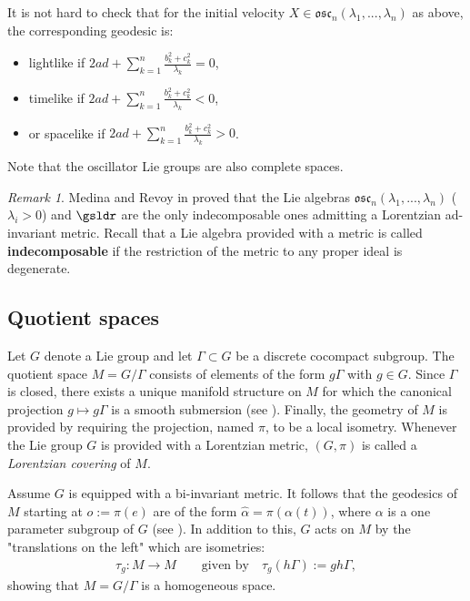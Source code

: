 \documentclass[12pt]{amsart}
\theoremstyle{plain}
\theoremstyle{definition}
\theoremstyle{remark}
\newtheorem{rem}{Remark}
\begin{document}
	It is not hard to check that for the initial velocity $X \in \mathfrak{osc}_n(\lambda_1,...,\lambda_n)$ as above, the corresponding geodesic is:
	\begin{itemize}
		\item lightlike if $2 a d + \sum_{k=1}^{n} \frac{b_k^2+c_k^2}{\lambda_k} = 0$,
		\item timelike if $2 a d + \sum_{k=1}^{n} \frac{b_k^2+c_k^2}{\lambda_k} < 0$, 
		\item or spacelike if $2 a d + \sum_{k=1}^{n} \frac{b_k^2+c_k^2}{\lambda_k} > 0$.
	\end{itemize}
	
	Note that the oscillator  Lie groups are also complete spaces. 
	
	\smallskip
	
	\begin{rem} Medina and Revoy  in \cite{Me,MeRe} proved that the Lie algebras $\mathfrak{osc}_n(\lambda_1,...,\lambda_n)$ ($\lambda_i > 0$) and $\gsldr$ are the only indecomposable ones admitting a Lorentzian ad-invariant metric. Recall that a Lie algebra provided with a metric is called \textbf{indecomposable} if the restriction of the metric to any proper ideal is degenerate. 
	\end{rem}
	
	
	\subsection{Quotient spaces} 
	
	
	
Let $G$ denote a Lie group and let  $\Gamma\subset G$ be a discrete cocompact subgroup. 	The quotient space $M=G/\Gamma$ consists of elements of the form $g\Gamma$ with $g \in G$. Since $\Gamma$ is closed, there exists a unique manifold structure on $M$ for which the canonical projection $g \mapsto g\Gamma$ is a smooth submersion (see \cite{Hel}). Finally, the geometry of $M$ is provided by requiring the projection, named $\pi$, to be a local isometry. Whenever the Lie group  $G$ is provided with a Lorentzian metric, $(G,\pi)$ is called  a \textit{Lorentzian covering} of $M$.
	
	
	
Assume $G$ is equipped with a bi-invariant metric. It follows  that the geodesics of $M$ starting at $o:=\pi(e)$ are of the form $\hat{\alpha}=\pi(\alpha(t))$, where $\alpha$ is a one parameter subgroup of $G$ (see \cite{ON}). In addition to this, $G$ acts on $M$ by the "translations on the left" which are isometries:
	\begin{eqnarray*}
		\tau_g : M \rightarrow M\qquad \mbox{given by} \quad 
		\tau_g(h\Gamma):=gh\Gamma,
	\end{eqnarray*}
	 showing that $M=G/\Gamma$ is a homogeneous space. 
	
\end{document}
